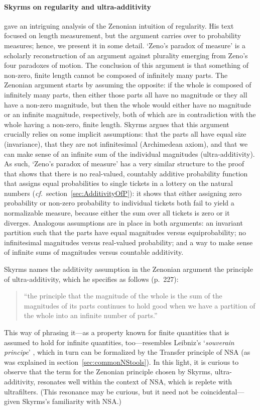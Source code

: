 \paragraph{Skyrms on regularity and ultra-additivity}\label{sec:Zenonian}
\citet{Skyrms:1983a} gave an intriguing analysis of the Zenonian intuition of regularity. His text focused on length measurement, but the argument carries over to probability measures; hence, we present it in some detail. `Zeno's paradox of measure' is a scholarly reconstruction of an argument against plurality emerging from Zeno's four paradoxes of motion. The conclusion of this argument is that something of non-zero, finite length cannot be composed of infinitely many parts. The Zenonian argument starts by assuming the opposite: if the whole is composed of infinitely many parts, then either those parts all have no magnitude or they all have a non-zero magnitude, but then the whole would either have no magnitude or an infinite magnitude, respectively, both of which are in contradiction with the whole having a non-zero, finite length.
Skyrms argues that this argument crucially relies on some implicit assumptions: that the parts all have equal size (invariance), that they are not infinitesimal (Archimedean axiom), and that we can make sense of an infinite sum of the individual magnitudes (ultra-additivity).
As such, `Zeno's paradox of measure' has a very similar structure to the proof that shows that there is no real-valued, countably additive probability function that assigns equal probabilities to single tickets in a lottery on the natural numbers (\textit{cf.}\ section~\ref{sec:AdditivityOfP}): it shows that either assigning zero probability or non-zero probability to individual tickets both fail to yield a normalizable measure, because either the sum over all tickets is zero or it diverges. Analogous assumptions are in place in both arguments: an invariant partition such that the parts have equal magnitudes versus equiprobability; no infinitesimal magnitudes versus real-valued probability; and a way to make sense of infinite sums of magnitudes versus countable additivity.

Skyrms names the additivity assumption in the Zenonian argument the principle of ultra-additivity, which he specifies as follows (p.~227):
\begin{quote}
``the principle that the magnitude of the whole is the sum of the magnitudes of its parts continues to hold good when we have a partition of the whole into an infinite number of parts.''
\end{quote}
This way of phrasing it---as a property known for finite quantities that is assumed to hold for infinite quantities, too---resembles Leibniz's `\textit{souverain principe}' \citep[see ][section~4.3]{KatzSherry:2012a}, which in turn can be formalized by the Transfer principle of NSA (as was explained in section~\ref{sec:commonNStools}). In this light, it is curious to observe that the term for the Zenonian principle chosen by Skyrms, ultra-additivity, resonates well within the context of NSA, which is replete with ultrafilters. (This resonance may be curious, but it need not be coincidental---given Skyrms's familiarity with NSA.)

